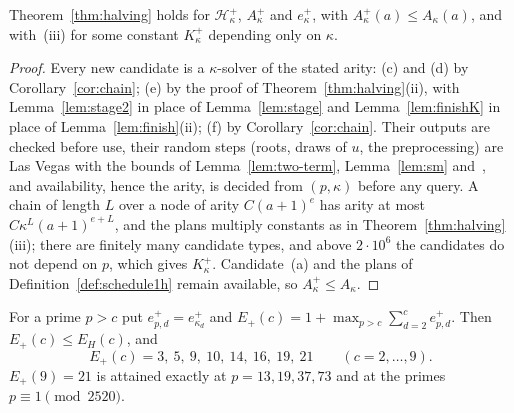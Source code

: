 \begin{theorem}[Schedule~1H$^+$]
\label{thm:halving-plus}
Theorem~\ref{thm:halving} holds for $\mathcal H^+_\kappa$, $A^+_\kappa$ and $e^+_\kappa$, with $A^+_\kappa(a) \le A_\kappa(a)$, and with~(iii) for some constant $K^+_\kappa$ depending only on $\kappa$.
\end{theorem}

\begin{proof}
Every new candidate is a $\kappa$-solver of the stated arity: (c) and (d) by Corollary~\ref{cor:chain}; (e) by the proof of Theorem~\ref{thm:halving}(ii), with Lemma~\ref{lem:stage2} in place of Lemma~\ref{lem:stage} and Lemma~\ref{lem:finishK} in place of Lemma~\ref{lem:finish}(ii); (f) by Corollary~\ref{cor:chain}. Their outputs are checked before use, their random steps (roots, draws of $u$, the preprocessing) are Las Vegas with the bounds of Lemma~\ref{lem:two-term}, Lemma~\ref{lem:sm} and~\cite{Rabin1980}, and availability, hence the arity, is decided from $(p,\kappa)$ before any query. A chain of length $L$ over a node of arity $C(a+1)^e$ has arity at most $C\kappa^L(a+1)^{e+L}$, and the plans multiply constants as in Theorem~\ref{thm:halving}(iii); there are finitely many candidate types, and above $2\cdot10^6$ the candidates do not depend on $p$, which gives $K^+_\kappa$. Candidate~(a) and the plans of Definition~\ref{def:schedule1h} remain available, so $A^+_\kappa \le A_\kappa$.
\end{proof}

\begin{lemma}
\label{lem:chain-exponent}
For a prime $p > c$ put $e^+_{p,d} = e^+_{\kappa_d}$ and $E_+(c) = 1 + \max_{p>c}\sum_{d=2}^ce^+_{p,d}$. Then $E_+(c) \le E_H(c)$, and
\[
  E_+(c) = 3,\ 5,\ 9,\ 10,\ 14,\ 16,\ 19,\ 21 \qquad (c = 2,\dots,9).
\]
$E_+(9) = 21$ is attained exactly at $p = 13, 19, 37, 73$ and at the primes $p \equiv 1 \pmod{2520}$.
\end{lemma}

